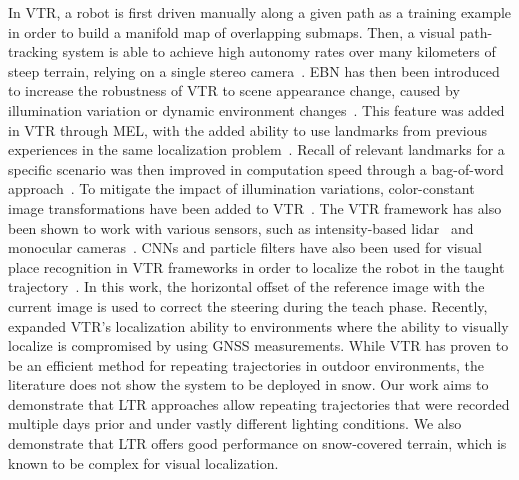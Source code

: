In \ac{VTR}, a robot is first driven manually along a given path as a training example in order to build a manifold map of overlapping submaps. 
Then, a visual path-tracking system is able to achieve high autonomy rates over many kilometers of steep terrain, relying on a single stereo camera~\citep{Furgale2010}. %
\ac{EBN} has then been introduced to increase the robustness of \ac{VTR} to scene appearance change, caused by illumination variation or dynamic environment changes~\citep{Churchill2013}. 
This feature was added in \ac{VTR} through \ac{MEL}, with the added ability to use landmarks from previous experiences in the same localization problem~\citep{Paton2016}.
Recall of relevant landmarks for a specific scenario was then improved in computation speed through a bag-of-word approach~\citep{MacTavish2017}.
To mitigate the impact of illumination variations, color-constant image transformations have been added to \ac{VTR}~\citep{Paton2015}. %
The \ac{VTR} framework has also been shown to work with various sensors, such as intensity-based lidar~\citep{McManus2013} and monocular cameras~\citep{Clement2017}.
\acp{CNN} and particle filters have also been used for visual place recognition in \ac{VTR} frameworks in order to localize the robot in the taught trajectory~\citep{Camara2020}.
In this work, the horizontal offset of the reference image with the current image is used to correct the steering during the teach phase.
Recently,~\citet{Congram2021} expanded \ac{VTR}'s localization ability to environments where the ability to visually localize is compromised by using \ac{GNSS} measurements.
While \ac{VTR} has proven to be an efficient method for repeating trajectories in outdoor environments, the literature does not show the system to be deployed in snow.
Our work aims to demonstrate that \ac{LTR} approaches allow repeating trajectories that were recorded multiple days prior and under vastly different lighting conditions. %
We also demonstrate that \ac{LTR} offers good performance on snow-covered terrain, which is known to be complex for visual localization.



